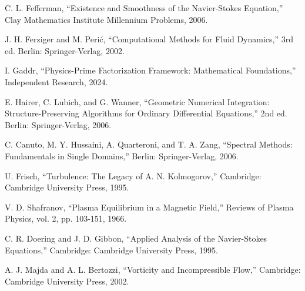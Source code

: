 \documentclass[conference]{IEEEtran}
\begin{document}
\begin{thebibliography}{9}

C. L. Fefferman, ``Existence and Smoothness of the Navier-Stokes Equation,'' Clay Mathematics Institute Millennium Problems, 2006.

J. H. Ferziger and M. Perić, ``Computational Methods for Fluid Dynamics,'' 3rd ed. Berlin: Springer-Verlag, 2002.

I. Gaddr, ``Physics-Prime Factorization Framework: Mathematical Foundations,'' Independent Research, 2024.

E. Hairer, C. Lubich, and G. Wanner, ``Geometric Numerical Integration: Structure-Preserving Algorithms for Ordinary Differential Equations,'' 2nd ed. Berlin: Springer-Verlag, 2006.

C. Canuto, M. Y. Hussaini, A. Quarteroni, and T. A. Zang, ``Spectral Methods: Fundamentals in Single Domains,'' Berlin: Springer-Verlag, 2006.

U. Frisch, ``Turbulence: The Legacy of A. N. Kolmogorov,'' Cambridge: Cambridge University Press, 1995.

V. D. Shafranov, ``Plasma Equilibrium in a Magnetic Field,'' Reviews of Plasma Physics, vol. 2, pp. 103-151, 1966.

C. R. Doering and J. D. Gibbon, ``Applied Analysis of the Navier-Stokes Equations,'' Cambridge: Cambridge University Press, 1995.

A. J. Majda and A. L. Bertozzi, ``Vorticity and Incompressible Flow,'' Cambridge: Cambridge University Press, 2002.

\end{thebibliography}
\end{document}
